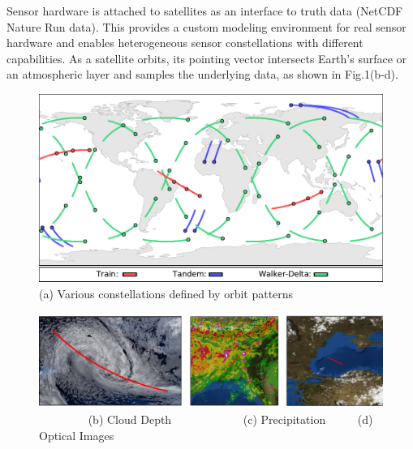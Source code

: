 \documentclass[conference]{IEEEtran}
\begin{document}
Sensor hardware is attached to satellites as an interface to truth data (NetCDF
Nature Run data).  This provides a custom modeling environment for real sensor
hardware and enables heterogeneous sensor constellations with different
capabilities.  As a satellite orbits, its pointing vector intersects Earth's
surface or an atmospheric layer and samples the underlying data, as shown in
Fig.1(b-d).

\begin{figure}[t]
  \begin{minipage}[b]{\linewidth}
    \begin{center}
      \includegraphics[width=\textwidth]{images/constellations.pdf}
      {\footnotesize(a) Various constellations defined by orbit patterns}
    \end{center}
    \medskip
  \end{minipage}
  \begin{minipage}[b]{\linewidth}
    \begin{center}
      \includegraphics[width=\textwidth]{images/remote_sensing.pdf}
      {\footnotesize{
          \color{white}~~~~~~~~\color{black}
          (b) Cloud Depth~~~~~~~~~~~~
          (c) Precipitation~~~~~
          (d) Optical Images}}
    \end{center}
    \medskip
  \end{minipage}
  \begin{minipage}[b]{\linewidth}
    \begin{center}

\end{center}
\end{minipage}
\end{figure}
\end{document}
